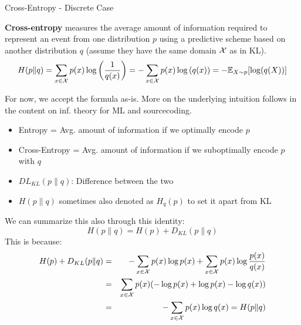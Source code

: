 \documentclass[11pt,compress,t,notes=noshow, xcolor=table]{beamer}
\begin{document}
    

\begin{vbframe} {Cross-Entropy - Discrete Case}

\textbf{Cross-entropy} measures the average amount of information required to represent an event from one distribution $p$ using a predictive scheme based on another distribution $q$ (assume they have the same domain $\mathcal{X}$ as in KL).
  $$ H(p \| q) = \sum_{x \in \mathcal{X}} p(x) \log\left(\frac{1}{q(x)}\right) = - \sum_{x \in \mathcal{X}} p(x) \log\left(q(x)\right) = - \mathbb{E}_{X\sim p}[\log(q(X))]$$

For now, we accept the formula as-is. More on the underlying intuition follows in the content on inf. theory for ML and sourcecoding.
\begin{itemize}
\setlength{\itemsep}{0.9em}
\item Entropy = Avg. amount of information if we optimally encode $p$
\item Cross-Entropy = Avg. amount of information if we suboptimally encode $p$ with $q$
\item $DL_ {KL}(p \| q)$: Difference between the two
\item $H(p \| q)$ sometimes also denoted as $H_{q}(p)$ to set it apart from KL
\end{itemize}

\framebreak

We can summarize this also through this identity: 
\lz
$$
H(p \| q) = H(p) + D_{KL}(p \| q)
$$
This is because: 
\begin{eqnarray*}
H(p) + D_{KL}(p \| q) &=& - \sum_{x \in \mathcal{X}} p(x) \log p(x) + \sum_{x \in \mathcal{X}} p(x) \log \frac{p(x)}{q(x)} \\
                      &=& \sum_{x \in \mathcal{X}} p(x) (-\log p(x) +  \log p(x) - \log q(x)) \\
&=& - \sum_{x \in \mathcal{X}} p(x) \log q(x) = H(p \| q) \\
\end{eqnarray*}
   
\framebreak
\end{vbframe}
\end{document}
